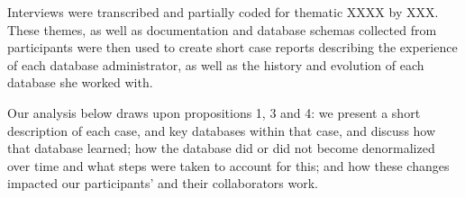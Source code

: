Interviews were transcribed and partially coded for thematic XXXX by XXX. These themes, as well as documentation and database schemas collected from participants were then used to create short case reports describing the experience of each database administrator, as well as  the history and evolution of each database she worked with.  

Our analysis below draws upon propositions 1, 3 and 4: we present a short description of each case, and key databases within that case, and discuss how that database learned; how the database did or did not become denormalized over time and what steps were taken to account for this; and how these changes impacted our participants' and their collaborators work. 
